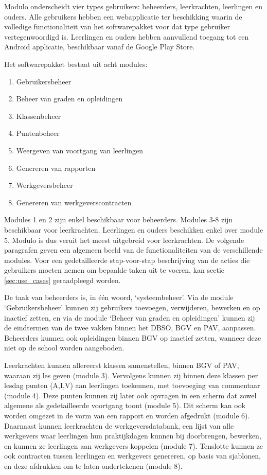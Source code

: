 \documentclass[a4paper]{article}
\begin{document}
Modulo onderscheidt vier types gebruikers: beheerders, leerkrachten, leerlingen en ouders. Alle gebruikers hebben een webapplicatie ter beschikking waarin de volledige functionaliteit van het softwarepakket voor dat type gebruiker vertegenwoordigd is. Leerlingen en ouders hebben aanvullend toegang tot een Android applicatie, beschikbaar vanaf de Google Play Store.

Het softwarepakket bestaat uit acht modules:

\begin{enumerate}
    \item Gebruikersbeheer
    \item Beheer van graden en opleidingen
    \item Klassenbeheer
    \item Puntenbeheer
    \item Weergeven van voortgang van leerlingen
    \item Genereren van rapporten
    \item Werkgeversbeheer
    \item Genereren van werkgeverscontracten
\end{enumerate}
Modules 1 en 2 zijn enkel beschikbaar voor beheerders. Modules 3-8 zijn beschikbaar voor leerkrachten. Leerlingen en ouders beschikken enkel over module 5. Modulo is dus veruit het meest uitgebreid voor leerkrachten. De volgende paragrafen geven een algemeen beeld van de functionaliteiten van de verschillende modules. Voor een gedetailleerde stap-voor-stap beschrijving van de acties die gebruikers moeten nemen om bepaalde taken uit te voeren, kan sectie \ref{sec:use_cases} geraadpleegd worden.

De taak van beheerders is, in één woord, `systeembeheer'. Via de module `Gebruikersbeheer' kunnen zij gebruikers toevoegen, verwijderen, bewerken en op inactief zetten, en via de module `Beheer van graden en opleidingen' kunnen zij de eindtermen van de twee vakken binnen het DBSO, BGV en PAV, aanpassen. Beheerders kunnen ook opleidingen binnen BGV op inactief zetten, wanneer deze niet op de school worden aangeboden.

Leerkrachten kunnen allereerst klassen samenstellen, binnen BGV of PAV, waaraan zij les geven (module 3). Vervolgens kunnen zij binnen deze klassen per lesdag punten (A,I,V) aan leerlingen toekennen, met toevoeging van commentaar (module 4). Deze punten kunnen zij later ook opvragen in een scherm dat zowel algemene als gedetailleerde voortgang toont (module 5). Dit scherm kan ook worden omgezet in de vorm van een rapport en worden afgedrukt (module 6). Daarnaast kunnen leerkrachten de werkgeversdatabank, een lijst van alle werkgevers waar leerlingen hun praktijkdagen kunnen bij doorbrengen, bewerken, en kunnen ze leerlingen aan werkgevers koppelen (module 7). Tenslotte kunnen ze ook contracten tussen leerlingen en werkgevers genereren, op basis van sjablonen, en deze afdrukken om te laten ondertekenen (module 8).
\end{document}
